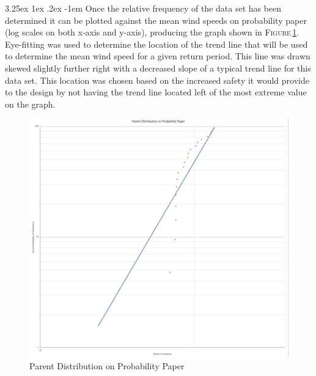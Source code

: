 \documentclass[11pt,a4paper,titlepage]{report}
\makeatletter
\renewcommand\paragraph{\@startsection{paragraph}{5}{\z@}%
  {3.25ex \@plus1ex \@minus.2ex}%
  {-1em}%
  {\normalfont\normalsize\bfseries}}
\makeatother
\begin{document}
\paragraph{}Once the relative frequency of the data set has been determined it can be plotted against the mean wind speeds on probability paper (log scales on both x-axis and y-axis), producing the graph shown in \textsc{Figure}\,\ref{fig:eq:I.6: f_rel}. Eye-fitting was used to determine the location of the trend line that will be used to determine the mean wind speed for a given return period. This line was drawn skewed slightly further right with a decreased slope of a typical trend line for this data set. This location was chosen based on the increased safety it would provide to the design by not having the trend line located left of the most extreme value on the graph.
\begin{figure}
    \centering
    \includegraphics[width=14cm]{f_rel.jpeg}
    \caption{Parent Distribution on Probability Paper}
    \label{fig:eq:I.6: f_rel}
\end{figure}
\end{document}
